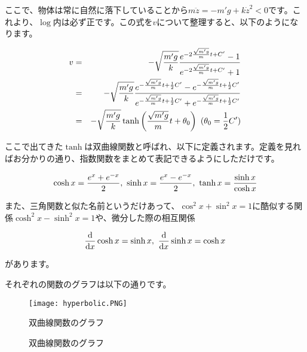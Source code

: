 ここで、物体は常に自然に落下していることから$m\ddot{z} = -m'g + k\dot{z}^2 < 0$です。これより、$\log$内は必ず正です。この式を$v$について整理すると、以下のようになります。

\begin{eqnarray}
    v &=& -\sqrt{\frac{m'g}{k}}\frac{e^{-2\frac{\sqrt{m'g}}{m}t+C'}-1}{e^{-2\frac{\sqrt{m'g}}{m}t+C'}+1} \notag \\
      &=& -\sqrt{\frac{m'g}{k}}\frac{e^{-\frac{\sqrt{m'g}}{m}t+\frac{1}{2}C'}-e^{-\frac{\sqrt{m'g}}{m}t+\frac{1}{2}C'}}{e^{-\frac{\sqrt{m'g}}{m}t+\frac{1}{2}C'}+e^{-\frac{\sqrt{m'g}}{m}t+\frac{1}{2}C'}} \notag \\
      &=& -\sqrt{\frac{m'g}{k}}\tanh\left(\frac{\sqrt{m'g}}{m}t+\theta_0\right) \ (\theta_0=\frac{1}{2}C')
\end{eqnarray}

ここで出てきた$\tanh$は双曲線関数と呼ばれ、以下に定義されます。定義を見ればお分かりの通り、指数関数をまとめて表記できるようにしただけです。

\begin{equation}
    \cosh x = \frac{e^x+e^{-x}}{2},\  \sinh x = \frac{e^x-e^{-x}}{2}, \ \tanh x = \frac{\sinh x}{\cosh x} \notag
\end{equation}

また、三角関数と似た名前というだけあって、$\cos^2 x + \sin^2 x = 1$に酷似する関係$\cosh^2 x - \sinh^2 x = 1$や、微分した際の相互関係

\begin{equation}
    \frac{\mathrm{d}}{\mathrm{d}x}\cosh x = \sinh x, \ \frac{\mathrm{d}}{\mathrm{d}x}\sinh x = \cosh x \notag
\end{equation}

があります。

それぞれの関数のグラフは以下の通りです。

\begin{figure}[!ht]
  \centering
  \texttt{[image: hyperbolic.PNG]}
  \caption{双曲線関数のグラフ}
  \label{fig:hyperbolic}
\end{figure}
\fi
\begin{figure}[htbp]
\begin{center}
\caption{双曲線関数のグラフ}
\end{center}
\end{figure}


